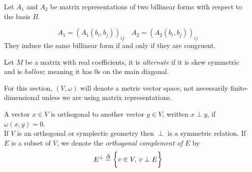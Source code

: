 \documentclass[../main-manifolds.tex]{subfiles}
\begin{document}
    \begin{wts}
        Let $A_1$ and $A_2$ be matrix representations of two billinear forms with respect to the basis $B$.
        
        \[
            A_1 = (A_1(b_i,b_j))_{ij}\quad A_2 = (A_2(b_i,b_j))_{ij}
        \]
        They induce the same billinear form if and only if they are congruent. 
    \end{wts}

    \begin{definition}
        Let $M$ be a matrix with real coefficients, it is \emph{alternate} if it is skew symmetric and is \emph{hollow}; meaning it has $0$s on the main diagonal.
    \end{definition}

    For this section, $(V,\omega)$ will denote a metric vector space, not necessarily finite-dimensional unless we are using matrix representations.
    
    \begin{definition}
        A vector $x\in V$ is orthogonal to another vector $y\in V$, written $x\perp y$, if $\omega(x,y)=0$. \\

        If $V$ is an orthogonal or symplectic geometry then $\perp$ is a symmetric relation. If $E$ is a subset of $V$, we denote the \emph{orthogonal complement of $E$} by 
        \[
            E^\perp \overset{\Delta}{=} \biggl\{{v\in V,\: v\perp E}\biggr\}
        \]
    \end{definition}
\end{document}
